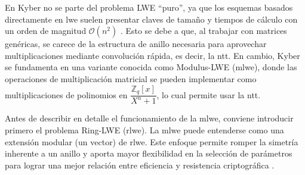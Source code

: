 En Kyber no se parte del problema LWE “puro”, ya que los esquemas basados directamente en \gls{lwe} suelen presentar claves de tamaño y tiempos de cálculo con un orden de magnitud \(\mathcal{O}(n^2)\) \cite{Micciancio2009}. Esto se debe a que, al trabajar con matrices genéricas, se carece de la estructura de anillo necesaria para aprovechar multiplicaciones mediante convolución rápida, es decir, la \gls{ntt}. En cambio, Kyber se fundamenta en una variante conocida como Modulus-LWE (\gls{mlwe}), donde las operaciones de multiplicación matricial se pueden implementar como multiplicaciones de polinomios en $\dfrac{\mathbb{Z}_q[x]}{X^n + 1}$, lo cual permite usar la \gls{ntt}.
\newline


Antes de describir en detalle el funcionamiento de la \gls{mlwe}, conviene introducir primero el problema Ring-LWE (\gls{rlwe}). La \gls{mlwe} puede entenderse como una extensión modular (un vector) de \gls{rlwe}. Este enfoque permite romper la simetría inherente a un anillo y aporta mayor flexibilidad en la selección de parámetros para lograr una mejor relación entre eficiencia y resistencia criptográfica \cite{cryptoeprint:2019/930}.
\newline

